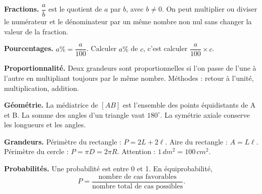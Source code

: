\documentclass[11pt,a4paper]{article}
\begin{document}
\begin{retenirbox}
\textbf{Fractions.} \(\dfrac{a}{b}\) est le quotient de \(a\) par \(b\), avec \(b\neq0\). On peut multiplier ou diviser le numérateur et le dénominateur par un même nombre non nul sans changer la valeur de la fraction.
\end{retenirbox}

\begin{retenirbox}
\textbf{Pourcentages.} \(a\%=\dfrac{a}{100}\). Calculer \(a\%\) de \(c\), c'est calculer \(\dfrac{a}{100}\times c\).
\end{retenirbox}

\begin{retenirbox}
\textbf{Proportionnalité.} Deux grandeurs sont proportionnelles si l'on passe de l'une à l'autre en multipliant toujours par le même nombre. Méthodes : retour à l'unité, multiplication, addition.
\end{retenirbox}

\begin{retenirbox}
\textbf{Géométrie.} La médiatrice de \([AB]\) est l'ensemble des points équidistants de A et B. La somme des angles d'un triangle vaut \(180^\circ\). La symétrie axiale conserve les longueurs et les angles.
\end{retenirbox}

\begin{retenirbox}
\textbf{Grandeurs.} Périmètre du rectangle : \(P=2L+2\ell\). Aire du rectangle : \(A=L\ell\). Périmètre du cercle : \(P=\pi D=2\pi R\). Attention : \(1\,dm^2=100\,cm^2\).
\end{retenirbox}

\begin{retenirbox}
\textbf{Probabilités.} Une probabilité est entre 0 et 1. En équiprobabilité,
\[
P=\frac{\text{nombre de cas favorables}}{\text{nombre total de cas possibles}}.
\]
\end{retenirbox}
\end{document}
